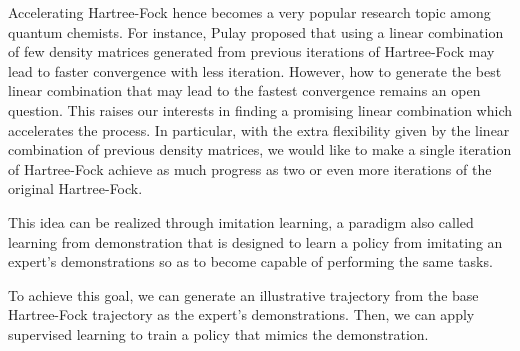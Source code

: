 \documentclass[twoside]{article}
\begin{document}

Accelerating Hartree-Fock hence becomes a very popular research topic among quantum chemists. For instance, Pulay \cite{Pulay1980} proposed that using a linear combination of few density matrices generated from previous iterations of Hartree-Fock may lead to faster convergence with less iteration. However, how to generate the best linear combination that may lead to the fastest convergence remains an open question. \cite{Konstantin2002}\cite{Thorsten2011}\cite{Alejandro2012}  This raises our interests in finding a promising linear combination which accelerates the process. In particular, with the extra flexibility given by the linear combination of previous density matrices, we would like to make a single iteration of Hartree-Fock achieve as much progress as two or even more iterations of the original Hartree-Fock.






This idea can be realized through imitation learning, a paradigm also called learning from demonstration that is designed to learn a policy from imitating an expert's demonstrations so as to become capable of performing the same tasks. 

To achieve this goal, we can generate an illustrative trajectory from the base Hartree-Fock trajectory as the expert's demonstrations. Then, we can apply supervised learning to train a policy that mimics the demonstration. 
\end{document}
